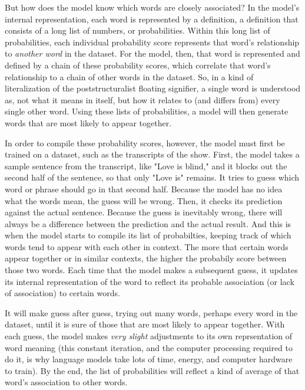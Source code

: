 \documentclass[11pt]{article}
\begin{document}
But how does the model know which words are closely associated? In the
model's internal representation, each word is represented by a
definition, a definition that consists of a long list of numbers, or
probabilities. Within this long list of probabilities, each individual
probability score represents that word's relationship to \emph{another
word} in the dataset. For the model, then, that word is represented
and defined by a chain of these probability scores, which correlate
that word's relationship to a chain of other words in the dataset. So,
in a kind of literalization of the poststructuralist floating
signifier, a single word is understood as, not what it means in
itself, but how it relates to (and differs from) every single other
word. Using these lists of probabilities, a model will then generate
words that are most likely to appear together.

In order to compile these probability scores, however, the model must
first be trained on a dataset, such as the transcripts of the show.
First, the model takes a sample sentence from the transcript, like
"Love is blind," and it blocks out the second half of the sentence, so
that only "Love is" remains. It tries to guess which word or phrase
should go in that second half. Because the model has no idea what the
words mean, the guess will be wrong. Then, it checks its prediction
against the actual sentence. Because the guess is inevitably wrong,
there will always be a difference between the prediction and the
actual result. And this is when the model starts to compile its list
of probabilties, keeping track of which words tend to appear with each
other in context. The more that certain words appear together or in
similar contexts, the higher the probabily score between those two
words. Each time that the model makes a subsequent guess, it updates
its internal representation of the word to reflect its probable
association (or lack of association) to certain words.

It will make guess after guess, trying out many words, perhaps every
word in the dataset, until it is sure of those that are most likely to
appear together. With each guess, the model makes \emph{very slight}
adjustments to its own reprsentation of word meaning (this constant
iteration, and the computer processing required to do it, is why
language models take lots of time, energy, and computer hardware to
train). By the end, the list of probabilities will reflect a kind of
average of that word's association to other words.
\end{document}
